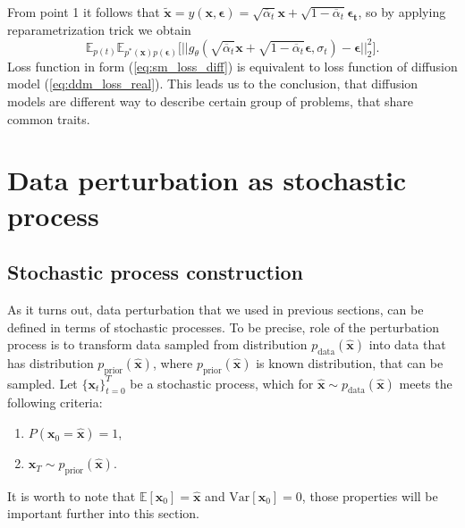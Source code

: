 \documentclass[10pt]{article}
\begin{document}
From point 1 it follows that 
$\tilde{\textbf{x}} = y(\textbf{x}, \bm{\epsilon}) = \sqrt{\overline{\alpha}_{t}} \textbf{x} +  \sqrt{1 - \overline{\alpha}_{t}} \bm{\epsilon_t}$, so by applying reparametrization trick we obtain 
\begin{equation}
\label{eq:sm_loss_diff}
    \mathbb{E}_{p(t)}
    \mathbb{E}_{p^*(\textbf{x})p(\bm{\epsilon}) }
    \Big[ || g_{\theta}(\sqrt{\overline{\alpha}_{t}} \textbf{x} +  \sqrt{1 - \overline{\alpha}_{t}} \bm{\epsilon}, \sigma_t ) - \bm{\epsilon}||_2^2 \Big].
\end{equation}
Loss function in form (\ref{eq:sm_loss_diff}) is equivalent to loss function of diffusion model (\ref{eq:ddm_loss_real}). This leads us to the conclusion, that diffusion models are different way to describe certain group of problems, that share common traits.
\section{Data perturbation as stochastic process }
\subsection{Stochastic process construction}
As it turns out, data perturbation that we used in previous sections, can be defined in terms of stochastic processes. To be precise, role of the perturbation process is to transform data sampled from distribution $p_{\text{data}}(\hat{\textbf{x} } )$ into data that has distribution $p_{\text{prior}}(\hat{\textbf{x} } )$, where $p_{\text{prior}}(\hat{\textbf{x} } )$ is known distribution, that can be sampled. Let $\{ \textbf{x}_t\}_{t=0}^T$ be a stochastic process, which for $ \hat{\textbf{x} } \sim p_{\text{data}}( \hat{\textbf{x} } )$ meets the following criteria:

\begin{enumerate}
    \item $ P( \textbf{x}_0  =  \hat{\textbf{x} } ) = 1$,
    \item $\textbf{x}_T \sim  p_{\text{prior}}(\hat{\textbf{x} } )$.
\end{enumerate}
It is worth to note that $\mathbb{E}[\textbf{x}_0] =  \hat{\textbf{x} }$ and $\text{Var}[\textbf{x}_0] = 0$, those properties will be important further into this section.
\end{document}
